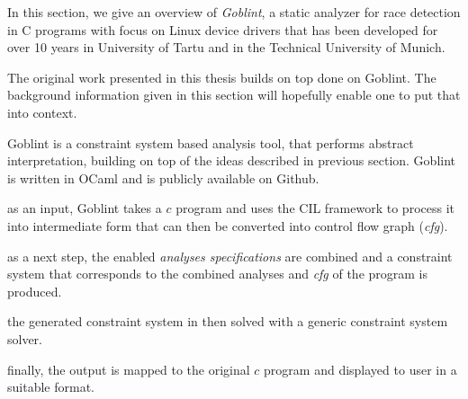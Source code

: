\documentclass[..thesis.tex]{subfiles}
\begin{document}

In this section, we give an overview  of \textit{Goblint}, a static analyzer for race detection in C programs with focus on Linux device drivers that has been developed for over 10 years in University of Tartu and in the Technical University of Munich.




The original work presented in this thesis builds on top done on Goblint. The background information given in this section will hopefully enable one to put that into context.


Goblint is a constraint system based analysis tool, that performs abstract interpretation, building on top of the ideas described in previous section. Goblint is written in OCaml and is publicly available on Github.


as an input, Goblint takes a $c$ program and uses the CIL framework to process it into intermediate form that can then be converted into control flow graph (\textit{cfg}). 


as a next step, the enabled \textit{analyses specifications} are combined and a constraint system that corresponds to the combined analyses and \textit{cfg} of the program is produced.

the generated constraint system in then solved with a generic constraint system solver. 

finally, the output is mapped to the original $c$ program and displayed to user in a suitable format.
\end{document}
